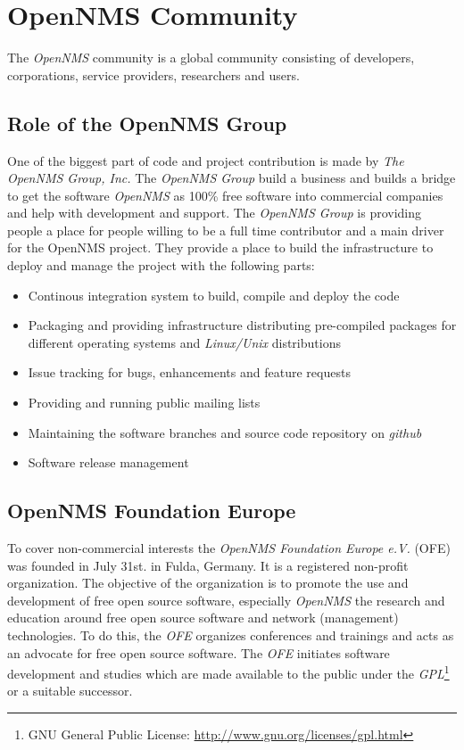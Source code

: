 \section{OpenNMS Community}
The \emph{OpenNMS} community is a global community consisting of developers, corporations, service providers, researchers and users.

\subsection*{Role of the OpenNMS Group}
One of the biggest part of code and project contribution is made by \emph{The OpenNMS Group, Inc.} The \emph{OpenNMS Group} build a business and builds a bridge to get the software \emph{OpenNMS} as 100\% free software into commercial companies and help with development and support. The \emph{OpenNMS Group} is providing people a place for people willing to be a full time contributor and a main driver for the OpenNMS project. They provide a place to build the infrastructure to deploy and manage the project with the following parts:
\begin{itemize}
  \item Continous integration system to build, compile and deploy the code
  \item Packaging and providing infrastructure distributing pre-compiled packages for different operating systems and \emph{Linux/Unix} distributions
  \item Issue tracking for bugs, enhancements and feature requests
  \item Providing and running public mailing lists
  \item Maintaining the software branches and source code repository on \emph{github}
  \item Software release management
\end{itemize}

\subsection*{OpenNMS Foundation Europe}
To cover non-commercial interests the \emph{OpenNMS Foundation Europe e.V.} (OFE) was founded in July 31st. in Fulda, Germany. It is a registered non-profit organization. The objective of the organization is to promote the use and development of free open source software, especially \emph{OpenNMS} the research and education around free open source software and network (management) technologies. To do this, the \emph{OFE} organizes conferences and trainings and acts as an advocate for free open source software. The \emph{OFE} initiates software development and studies which are made available to the public under the \emph{GPL}\footnote{GNU General Public License: \url{http://www.gnu.org/licenses/gpl.html}} or a suitable successor.

